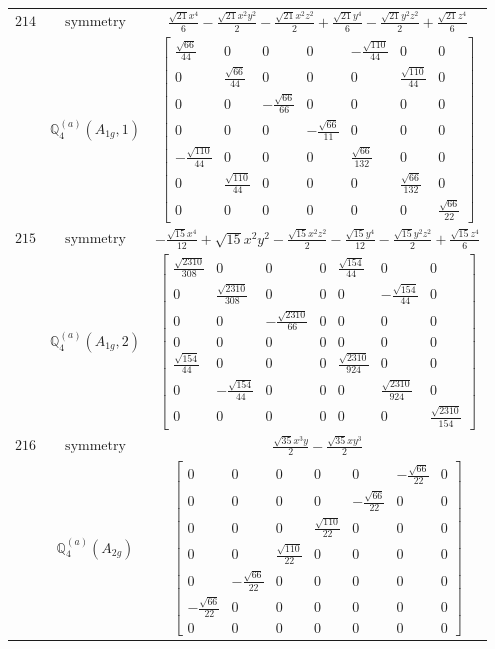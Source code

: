 \documentclass[fleqn,8pt,landscape]{jsarticle}
\begin{document}
\begin{longtable}{ccc}
$ 214 $ & $ \text{symmetry} $ & $ \frac{\sqrt{21} x^{4}}{6} - \frac{\sqrt{21} x^{2} y^{2}}{2} - \frac{\sqrt{21} x^{2} z^{2}}{2} + \frac{\sqrt{21} y^{4}}{6} - \frac{\sqrt{21} y^{2} z^{2}}{2} + \frac{\sqrt{21} z^{4}}{6} $ \\
$  $ & $ \mathbb{Q}_{4}^{(a)}(A_{1g},1) $ & $ \begin{bmatrix} \frac{\sqrt{66}}{44} & 0 & 0 & 0 & - \frac{\sqrt{110}}{44} & 0 & 0 \\ 0 & \frac{\sqrt{66}}{44} & 0 & 0 & 0 & \frac{\sqrt{110}}{44} & 0 \\ 0 & 0 & - \frac{\sqrt{66}}{66} & 0 & 0 & 0 & 0 \\ 0 & 0 & 0 & - \frac{\sqrt{66}}{11} & 0 & 0 & 0 \\ - \frac{\sqrt{110}}{44} & 0 & 0 & 0 & \frac{\sqrt{66}}{132} & 0 & 0 \\ 0 & \frac{\sqrt{110}}{44} & 0 & 0 & 0 & \frac{\sqrt{66}}{132} & 0 \\ 0 & 0 & 0 & 0 & 0 & 0 & \frac{\sqrt{66}}{22} \end{bmatrix} $ \\ \hline
$ 215 $ & $ \text{symmetry} $ & $ - \frac{\sqrt{15} x^{4}}{12} + \sqrt{15} x^{2} y^{2} - \frac{\sqrt{15} x^{2} z^{2}}{2} - \frac{\sqrt{15} y^{4}}{12} - \frac{\sqrt{15} y^{2} z^{2}}{2} + \frac{\sqrt{15} z^{4}}{6} $ \\
$  $ & $ \mathbb{Q}_{4}^{(a)}(A_{1g},2) $ & $ \begin{bmatrix} \frac{\sqrt{2310}}{308} & 0 & 0 & 0 & \frac{\sqrt{154}}{44} & 0 & 0 \\ 0 & \frac{\sqrt{2310}}{308} & 0 & 0 & 0 & - \frac{\sqrt{154}}{44} & 0 \\ 0 & 0 & - \frac{\sqrt{2310}}{66} & 0 & 0 & 0 & 0 \\ 0 & 0 & 0 & 0 & 0 & 0 & 0 \\ \frac{\sqrt{154}}{44} & 0 & 0 & 0 & \frac{\sqrt{2310}}{924} & 0 & 0 \\ 0 & - \frac{\sqrt{154}}{44} & 0 & 0 & 0 & \frac{\sqrt{2310}}{924} & 0 \\ 0 & 0 & 0 & 0 & 0 & 0 & \frac{\sqrt{2310}}{154} \end{bmatrix} $ \\ \hline
$ 216 $ & $ \text{symmetry} $ & $ \frac{\sqrt{35} x^{3} y}{2} - \frac{\sqrt{35} x y^{3}}{2} $ \\
$  $ & $ \mathbb{Q}_{4}^{(a)}(A_{2g}) $ & $ \begin{bmatrix} 0 & 0 & 0 & 0 & 0 & - \frac{\sqrt{66}}{22} & 0 \\ 0 & 0 & 0 & 0 & - \frac{\sqrt{66}}{22} & 0 & 0 \\ 0 & 0 & 0 & \frac{\sqrt{110}}{22} & 0 & 0 & 0 \\ 0 & 0 & \frac{\sqrt{110}}{22} & 0 & 0 & 0 & 0 \\ 0 & - \frac{\sqrt{66}}{22} & 0 & 0 & 0 & 0 & 0 \\ - \frac{\sqrt{66}}{22} & 0 & 0 & 0 & 0 & 0 & 0 \\ 0 & 0 & 0 & 0 & 0 & 0 & 0 \end{bmatrix} $ \\ \hline

\end{longtable}
\end{document}
